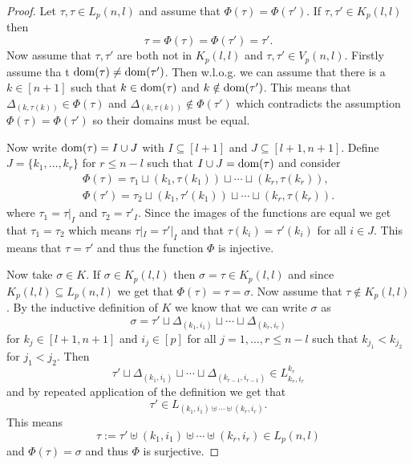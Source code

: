 \begin{proof}
    Let $\tau, \tau \in L_p(n,l)$ and assume that $\Phi(\tau) = \Phi(\tau')$. If $\tau, \tau' \in K_p(l,l)$ then \[\tau = \Phi(\tau) = \Phi(\tau') = \tau'.\] Now assume that $\tau, \tau'$ are both not in $K_p(l,l)$ and $\tau, \tau' \in V_p(n, l)$. Firstly assume tha t ${\rm dom}(\tau) \neq {\rm dom}(\tau')$. Then w.l.o.g. we can assume that there is a $k\in [n+1]$ such that $k \in {\rm dom}(\tau)$ and $k \notin {\rm dom}(\tau')$. This means that $\Delta_{(k,\tau(k))}\in \Phi(\tau)$ and $\Delta_{(k,\tau(k))}\notin \Phi(\tau')$ which contradicts the assumption $\Phi(\tau) = \Phi(\tau')$ so their domains must be equal.

    Now write ${\rm dom}(\tau) = I \cup J$ with $I \subseteq [l+1]$ and $J \subseteq [l+1,n+1]$. Define $J = \{k_1, \ldots, k_r\}$ for $r \leq n-l$ such that $I \cup J = {\rm dom}(\tau)$ and consider
    \begin{align*}
      \Phi(\tau) = \tau_1 \sqcup (k_1, \tau(k_1)) \sqcup \cdots \sqcup (k_r, \tau(k_r)), \\
      \Phi(\tau') = \tau_2 \sqcup (k_1, \tau'(k_1)) \sqcup \cdots \sqcup (k_r, \tau(k_r)).
    \end{align*}
    where $\tau_1 = \tau|_I$ and $\tau_2 = \tau'_I$. Since the images of the functions are equal we get that $\tau_1 = \tau_2$ which means $\tau|_I = \tau'|_I$ and that $\tau(k_i) = \tau'(k_i)$ for all $i \in J$. This means that $\tau = \tau'$ and thus the function $\Phi$ is injective.

    Now take $\sigma \in K$. If $\sigma \in K_p(l,l)$ then $\sigma = \tau \in K_p(l,l)$ and since $K_p(l,l) \subseteq L_p(n,l)$ we get that $\Phi(\tau) = \tau = \sigma$. Now assume that $\tau \notin K_p(l,l)$. By the inductive definition of $K$ we know that we can write $\sigma$ as \[\sigma = \tau' \sqcup \Delta_{(k_1,i_1)} \sqcup \cdots \sqcup \Delta_{(k_r,i_r)}\] for $k_j \in [l+1,n+1]$ and $i_j \in [p]$ for all $j = 1,\ldots,r \leq n-l$ such that $k_{j_1} < k_{j_2}$ for $j_1 < j_2$. Then \[ \tau' \sqcup \Delta_{(k_1,i_1)} \sqcup \cdots \sqcup \Delta_{(k_{r-1},i_{r-1})}\in L^{k_r}_{k_r, i_r}\] and by repeated application of the definition we get that \[\tau' \in L_{(k_1,i_1)\uplus\cdots\uplus(k_r,i_r)}.\] This means \[\tau := \tau' \uplus (k_1, i_1) \uplus \cdots \uplus (k_r,i_r) \in L_p(n,l)\] and $\Phi(\tau) = \sigma$ and thus $\Phi$ is surjective.


\end{proof}
